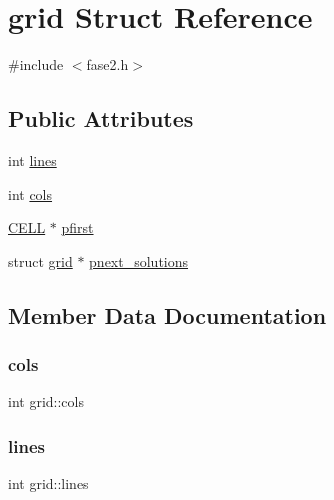 \hypertarget{structgrid}{}\section{grid Struct Reference}
\label{structgrid}


{\ttfamily \#include $<$fase2.\+h$>$}

\subsection*{Public Attributes}
\begin{DoxyCompactItemize}
\item 
int \mbox{\hyperlink{structgrid_a18085ab11fc0fc7f464def6576734865}{lines}}
\item 
int \mbox{\hyperlink{structgrid_a7e7a35376f53038220530f005fb873f0}{cols}}
\item 
\mbox{\hyperlink{fase2_8h_ad8a16a9022d96f964fca68b495a55125}{C\+E\+LL}} $\ast$ \mbox{\hyperlink{structgrid_a1905374d0fa641196f47385052927397}{pfirst}}
\item 
struct \mbox{\hyperlink{structgrid}{grid}} $\ast$ \mbox{\hyperlink{structgrid_a540ceb7b55232237335a503ab262413f}{pnext\+\_\+solutions}}
\end{DoxyCompactItemize}


\subsection{Member Data Documentation}
\mbox{\label{structgrid_a7e7a35376f53038220530f005fb873f0}} 
\subsubsection{\texorpdfstring{cols}{cols}}
{\footnotesize\ttfamily int grid\+::cols}

\mbox{\label{structgrid_a18085ab11fc0fc7f464def6576734865}} 
\subsubsection{\texorpdfstring{lines}{lines}}
{\footnotesize\ttfamily int grid\+::lines}

\mbox{\label{structgrid_a1905374d0fa641196f47385052927397}} 
